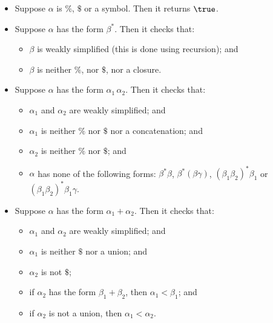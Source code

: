 \begin{itemize}
\item Suppose $\alpha$ is $\%$, $\$$ or a symbol.  Then it returns $\true$.

\item Suppose $\alpha$ has the form $\beta^*$.  Then it checks that:
  \begin{itemize}
  \item $\beta$ is weakly simplified (this is done using recursion); and

  \item $\beta$ is neither $\%$, nor $\$$, nor a closure.
  \end{itemize}

\item Suppose $\alpha$ has the form $\alpha_1\,\alpha_2$.  Then it
  checks that:
  \begin{itemize}
  \item $\alpha_1$ and $\alpha_2$ are weakly simplified; and

  \item $\alpha_1$ is neither $\%$ nor $\$$ nor a concatenation; and

  \item $\alpha_2$ is neither $\%$ nor $\$$; and

  \item $\alpha$ has none of the following forms: $\beta^*\beta$,
    $\beta^*(\beta\gamma)$, $(\beta_1\beta_2)^*\beta_1$ or
    $(\beta_1\beta_2)^*\beta_1\gamma$.
  \end{itemize}
  
\item Suppose $\alpha$ has the form $\alpha_1 + \alpha_2$.  Then it
  checks that:
  \begin{itemize}
  \item $\alpha_1$ and $\alpha_2$ are weakly simplified; and

  \item $\alpha_1$ is neither $\$$ nor a union; and

  \item $\alpha_2$ is not $\$$;

  \item if $\alpha_2$ has the form $\beta_1 + \beta_2$, then
    $\alpha_1<\beta_1$; and

  \item if $\alpha_2$ is not a union, then $\alpha_1<\alpha_2$.
  \end{itemize}
\end{itemize}

